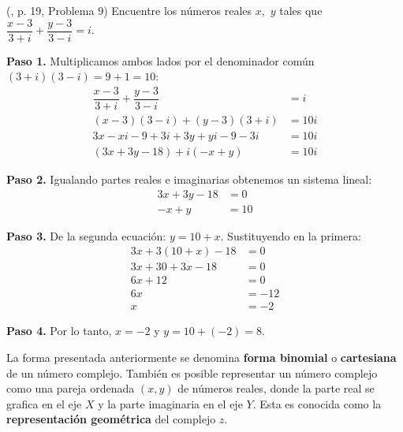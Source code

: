 \begin{example} (\cite{andreescu2014complex}, p. 19, Problema 9) Encuentre los números reales $x,$ $y$ tales que $\dfrac{x-3}{3+i}+\dfrac{y-3}{3-i}=i.$
\begin{myproof}
\textbf{Paso 1.} Multiplicamos ambos lados por el denominador común $(3+i)(3-i)=9+1=10$:
\begin{align*}
\dfrac{x-3}{3+i}+\dfrac{y-3}{3-i}&=i\\
(x-3)(3-i)+(y-3)(3+i)&=10i\\
3x-xi-9+3i+3y+yi-9-3i&=10i\\
(3x+3y-18)+i(-x+y)&=10i
\end{align*}

\textbf{Paso 2.} Igualando partes reales e imaginarias obtenemos un sistema lineal:
\begin{align*}
3x+3y-18&=0\\
-x+y&=10
\end{align*}

\textbf{Paso 3.} De la segunda ecuación: $y=10+x$. Sustituyendo en la primera:
\begin{align*}
3x+3(10+x)-18&=0\\
3x+30+3x-18&=0\\
6x+12&=0\\
6x&=-12\\
x&=-2
\end{align*}

\textbf{Paso 4.} Por lo tanto, $\boxed{x=-2}$ y $\boxed{y=10+(-2)=8}$.
\end{myproof}
\end{example}

La forma presentada anteriormente se denomina \textbf{forma binomial} o \textbf{cartesiana} de un número complejo. También es posible representar un número complejo como una pareja ordenada $(x,y)$ de números reales, donde la parte real se grafica en el eje $X$ y la parte imaginaria en el eje $Y$. Esta es conocida como la \textbf{representación geométrica} del complejo $z$.

